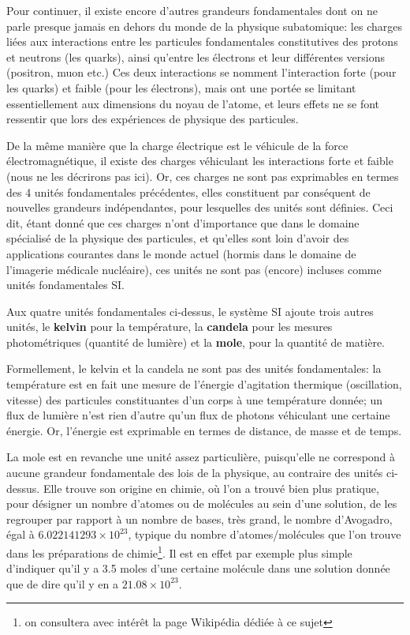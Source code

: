 Pour continuer, il existe encore d'autres grandeurs fondamentales dont on ne parle presque jamais en dehors du monde de la physique subatomique: les charges liées aux interactions entre les particules fondamentales constitutives des protons et neutrons (les quarks), ainsi qu'entre les électrons et leur différentes versions (positron, muon etc.) Ces deux interactions se nomment l'interaction forte (pour les quarks) et faible (pour les électrons), mais ont une portée se limitant essentiellement aux dimensions du noyau de l'atome, et leurs effets ne se font ressentir que lors des expériences de physique des particules.

De la même manière que la charge électrique est le véhicule de la force électromagnétique, il existe des charges véhiculant les interactions forte et faible (nous ne les décrirons pas ici). Or, ces charges ne sont pas exprimables en termes des 4 unités fondamentales précédentes, elles constituent par conséquent de nouvelles grandeurs indépendantes, pour lesquelles des unités sont définies. Ceci dit, étant donné que ces charges n'ont d'importance que dans le domaine spécialisé de la physique des particules, et qu'elles sont loin d'avoir des applications courantes dans le monde actuel (hormis dans le domaine de l'imagerie médicale nucléaire), ces unités ne sont pas (encore) incluses comme unités fondamentales SI.

Aux quatre unités fondamentales ci-dessus, le système SI ajoute trois autres unités, le \textbf{kelvin} pour la température, la \textbf{candela} pour les mesures photométriques (quantité de lumière) et la \textbf{mole}, pour la quantité de matière.

Formellement, le kelvin et la candela ne sont pas des unités fondamentales: la température est en fait une mesure de l'énergie d'agitation thermique (oscillation, vitesse) des particules constituantes d'un corps à une température donnée; un flux de lumière n'est rien d'autre qu'un flux de photons véhiculant une certaine énergie. Or, l'énergie est exprimable en termes de distance, de masse et de temps.

La mole est en revanche une unité assez particulière, puisqu'elle ne correspond à aucune grandeur fondamentale des lois de la physique, au contraire des unités ci-dessus. Elle trouve son origine en chimie, où l'on a trouvé bien plus pratique, pour désigner un nombre d'atomes ou de molécules au sein d'une solution, de les regrouper par rapport à un nombre de bases, très grand, le nombre d'Avogadro, égal à $6.022141293\times 10^{23}$, typique du nombre d'atomes/molécules que l'on trouve dans les préparations de chimie\footnote{on consultera avec intérêt la page Wikipédia dédiée à ce sujet}. Il est en effet par exemple plus simple d'indiquer qu'il y a 3.5 moles d'une certaine molécule dans une solution donnée que de dire qu'il y en a $21.08\times 10^{23}$.

